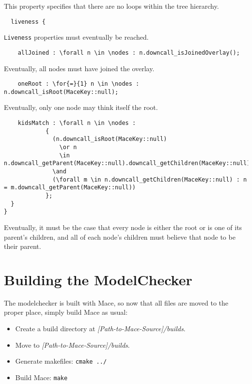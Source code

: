 \documentclass[12pt,letterpaper]{article}
\newenvironment{code}
{\begin{list}{}{\setlength{\leftmargin}{1em}}\item\scriptsize\bfseries}
{\end{list}}
\begin{document}
This property specifies that there are no loops within the tree hierarchy.
\begin{code}
\begin{verbatim}
  liveness {
\end{verbatim}
\end{code}
\texttt{Liveness} properties must eventually be reached.
\begin{code}
\begin{verbatim}
    allJoined : \forall n \in \nodes : n.downcall_isJoinedOverlay();
\end{verbatim}
\end{code}
Eventually, all nodes must have joined the overlay.
\begin{code}
\begin{verbatim}
    oneRoot : \for{=}{1} n \in \nodes : n.downcall_isRoot(MaceKey::null);
\end{verbatim}
\end{code}
Eventually, only one node may think itself the root.
\begin{code}
\begin{verbatim}
    kidsMatch : \forall n \in \nodes :
            {
              (n.downcall_isRoot(MaceKey::null) 
                \or n 
                \in n.downcall_getParent(MaceKey::null).downcall_getChildren(MaceKey::null))
              \and 
              (\forall m \in n.downcall_getChildren(MaceKey::null) : n = m.downcall_getParent(MaceKey::null))
            };
  }
}
\end{verbatim}
\end{code}
Eventually, it must be the case that every node is either the root or is one of its parent's children, and all of each node's children must believe that node to be their parent.


\section{Building the ModelChecker}
\label{BuildingMC}
The modelchecker is built with Mace, so now that all files are moved to the proper place, simply build Mace as usual:
\begin{itemize} 
\item Create a build directory at \emph{[Path-to-Mace-Source]/builds}.
\item Move to \emph{[Path-to-Mace-Source]/builds}.
\item Generate makefiles:  \texttt{cmake ../}
\item Build Mace: \texttt{make}
\end{itemize}
\end{document}
